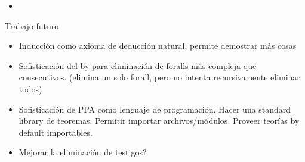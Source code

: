 \begin{itemize}
    \item {}
\end{itemize}

Trabajo futuro

\begin{itemize}
    \item Inducción como axioma de deducción natural, permite demostrar más cosas
    \item Sofisticación del by para eliminación de foralls más compleja que
    consecutivos. (elimina un solo forall, pero no intenta recursivamente
    eliminar todos)
    \item Sofisticación de PPA como lenguaje de programación. Hacer una standard library de
    teoremas. Permitir importar archivos/módulos. Proveer teorías by default importables.
    \item Mejorar la eliminación de testigos?
\end{itemize}